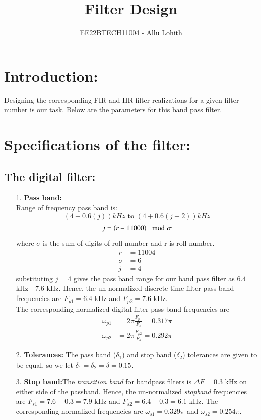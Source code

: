 \documentclass{article}
\begin{document}

\vspace{3cm}

\title{Filter Design}
\author{EE22BTECH11004 - Allu Lohith}

\maketitle
\newpage
\bigskip
\section{Introduction:}
Designing the corresponding FIR and IIR filter realizations for a given filter number is our task. Below are the parameters for this band pass filter.
\section{Specifications of the filter:}
\subsection{The digital filter:}
\begin{enumerate}
    \item[1.] \textbf{Pass band:}\\
    Range of frequency pass band is:  $$(4 + 0.6(j))kHz \text{ to } (4 + 0.6(j+2))kHz$$
\begin{align}
    j=\left(r-11000\right) \mod \sigma
\end{align}
where $\sigma$ is the sum of digits of roll number and r is roll number.
\begin{align}
    r&=11004\\
    \sigma&=6\\
    j&=4
\end{align}
substituting $j=4$ gives the pass band range for our band pass filter as $6.4$ kHz - $7.6$ kHz.  Hence, the un-normalized discrete time filter pass band frequencies are $F_{p1} = 6.4$ kHz and $F_{p2}=7.6$ kHz.\\
The corresponding normalized digital filter pass band frequencies are
\begin{align}
    \omega_{p1} &= 2\pi\frac{F_{p1}}{F_s} = 0.317\pi\\
    \omega_{p2} &= 2\pi\frac{F_{p2}}{F_s}  =0.292\pi
\end{align}
\item[2.] \textbf{Tolerances:} 
 The pass band ($\delta_1$) and stop band ($\delta_2$) tolerances are given to
be equal, so we let $\delta_1 = \delta_2 = \delta = 0.15$.\\
\item[3.] \textbf{Stop band:}The {\em transition band} for bandpass filters is $\Delta F = 0.3$ kHz on either side of the passband.
Hence, the un-normalized {\em stopband} frequencies are $F_{s1} = 7.6 + 0.3 = 7.9$ kHz and $F	_{s2} = 6.4 - 0.3 = 6.1$ kHz.  The corresponding normalized frequencies are $\omega_{s1} = 0.329 \pi$  and $\omega_{s2} =  0.254 \pi$.
\end{enumerate}
\end{document}
